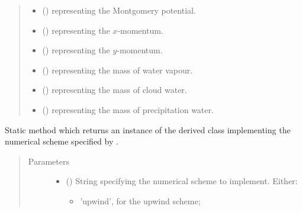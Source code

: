 \documentclass[letterpaper,10pt,english]{sphinxmanual}
\begin{document}
\begin{fulllineitems}
\begin{fulllineitems}
\begin{quote}
\begin{description}
\begin{itemize}
\item {} 
 () \textendash{}  representing the Montgomery potential.

\item {} 
 () \textendash{}  representing the \(x\)-momentum.

\item {} 
 () \textendash{}  representing the \(y\)-momentum.

\item {} 
 () \textendash{}  representing the mass of water vapour.

\item {} 
 () \textendash{}  representing the mass of cloud water.

\item {} 
 () \textendash{}  representing the mass of precipitation water.

\end{itemize}

\end{description}\end{quote}

\end{fulllineitems}


\begin{fulllineitems}
\label{\detokenize{api:dycore.flux_isentropic.FluxIsentropic.factory}}
Static method which returns an instance of the derived class implementing the numerical scheme
specified by .
\begin{quote}\begin{description}
\item[{Parameters}] \leavevmode\begin{itemize}
\item {} 
 () \textendash{} 
String specifying the numerical scheme to implement. Either:
\begin{itemize}
\item {} 
’upwind’, for the upwind scheme;


\end{itemize}
\end{itemize}
\end{description}
\end{quote}
\end{fulllineitems}
\end{fulllineitems}
\end{document}
